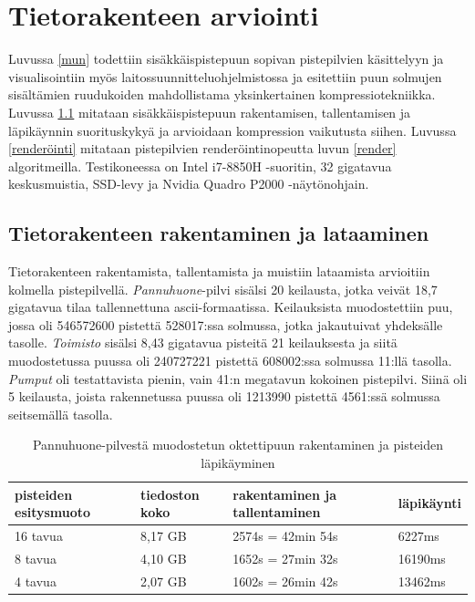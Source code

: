 \section{Tietorakenteen arviointi}\label{tulokset}

Luvussa \ref{mun} todettiin sisäkkäispistepuun sopivan pistepilvien käsittelyyn ja visualisointiin myös laitossuunnitteluohjelmistossa ja esitettiin puun solmujen sisältämien ruudukoiden mahdollistama yksinkertainen kompressiotekniikka. Luvussa \ref{rakentaminen} mitataan sisäkkäispistepuun rakentamisen, tallentamisen ja läpikäynnin suorituskykyä ja arvioidaan kompression vaikutusta siihen. Luvussa \ref{renderöinti} mitataan pistepilvien renderöintinopeutta luvun \ref{render} algoritmeilla. Testikoneessa on Intel i7-8850H -suoritin, 32 gigatavua keskusmuistia, SSD-levy ja Nvidia Quadro P2000 -näytönohjain.  

\subsection{Tietorakenteen rakentaminen ja lataaminen}\label{rakentaminen}

Tietorakenteen rakentamista, tallentamista ja muistiin lataamista arvioitiin kolmella pistepilvellä. \emph{Pannuhuone}-pilvi sisälsi 20 keilausta, jotka veivät 18,7 gigatavua tilaa tallennettuna ascii-formaatissa. Keilauksista muodostettiin puu, jossa oli 546572600 pistettä 528017:ssa solmussa, jotka jakautuivat yhdeksälle tasolle. \emph{Toimisto} sisälsi 8,43 gigatavua pisteitä 21 keilauksesta ja siitä muodostetussa puussa oli 240727221 pistettä 608002:ssa solmussa 11:llä tasolla. \emph{Pumput} oli testattavista pienin, vain 41:n megatavun kokoinen pistepilvi. Siinä oli 5 keilausta, joista rakennetussa puussa oli 1213990 pistettä 4561:ssä solmussa seitsemällä tasolla.  

\begin{table}[h]
    \begin{tabular}{llll}
    \hline
    pisteiden esitysmuoto & tiedoston koko & rakentaminen ja tallentaminen & läpikäynti \\ \hline
    16 tavua       & 8,17 GB             & 2574s = 42min 54s              & 6227ms     \\
    8 tavua        & 4,10 GB             & 1652s = 27min 32s             & 16190ms    \\
    4 tavua        & 2,07 GB             & 1602s = 26min 42s             & 13462ms    \\ \hline
    \end{tabular}
    \caption{Pannuhuone-pilvestä muodostetun oktettipuun rakentaminen ja pisteiden läpikäyminen}
    \label{taulukko:pannuhuone}
\end{table}


